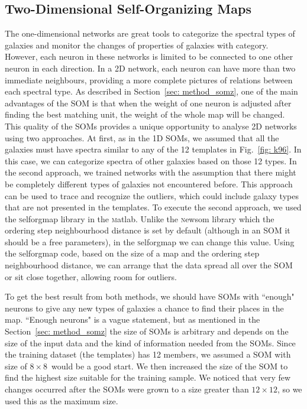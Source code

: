     \subsection{Two-Dimensional Self-Organizing Maps}
    \label{sec: 2D}
    The one-dimensional networks are great tools to categorize the spectral types of galaxies and monitor the changes of properties of galaxies with category.
    However, each neuron in these networks is limited to be connected to one other neuron in each direction.
    In a 2D network, each neuron can have more than two immediate neighbours, providing a more complete pictures of relations between each spectral type.
    As described in Section~\ref{sec: method_somz}, one of the main advantages of the SOM is that when the weight of one neuron is adjusted after finding the best matching unit, the weight of the whole map will be changed.
    This quality of the SOMs provides a unique opportunity to analyse 2D networks using two approaches. 
    At first, as in the 1D SOMs, we assumed that all the galaxies must have spectra similar to any of the 12 templates in Fig.~\ref{fig: k96}.
    In this case, we can categorize spectra of other galaxies based on those 12 types.
    In the second approach, we trained networks with the assumption that there might be completely different types of galaxies not encountered before.
    This approach can be used to trace and recognize the outliers, which could include galaxy types that are not presented in the  templates.
    To execute the second approach, we used the {\textsc selforgmap} library in the {\textsc matlab}.
    Unlike the {\textsc newsom} library which the ordering step neighbourhood distance is set by default (although in an SOM it should be a free parameters), in the {\textsc selforgmap} we can change this value.
    Using the {\textsc selforgmap} code, based on the size of a map and the ordering step neighbourhood distance, we can arrange that the data spread all over the SOM or sit close together, allowing room for outliers.

    To get the best result from both methods, we should have SOMs with ``enough"  neurons to give any new types of galaxies a chance to find their places in the map.
    ``Enough neurons" is a vague statement, but as mentioned in the Section~\ref{sec: method_somz} the size of SOMs is arbitrary and depends on the size of the input data and the kind of information needed from the SOMs.
    Since the training dataset (the  templates) has 12 members, we assumed a SOM with size of $8\times8$~would be a good start.
    We then increased the size of the SOM to find the highest size suitable for the training sample.
    We noticed that very few changes occurred after the SOMs were grown to a size greater than $12\times12$, so we used this as the maximum size.
    
